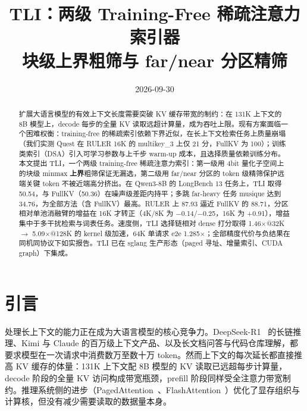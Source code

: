 \documentclass[11pt]{article}
\title{TLI：两级 Training-Free 稀疏注意力索引器\\
\large 块级上界粗筛与 far/near 分区精筛}
\date{2026-09-30}
\begin{document}
\maketitle

\begin{abstract}
扩展大语言模型的有效上下文长度需要突破 KV 缓存带宽的制约：在 131K 上下文的 8B 模型上，decode 每步的全量 KV 读取远超计算量，成为吞吐上限。现有方案面临一个困难权衡：training-free 的稀疏索引依赖下界近似，在长上下文检索任务上质量崩塌（我们实测 Quest 在 RULER 16K 的 multikey\_3 上仅 21 分，FullKV 为 100）；训练类索引（DSA）引入可学习参数与上千步 warm-up 成本，且选择质量依赖训练分布。本文提出 TLI，一个两级 training-free 稀疏注意力索引：第一级用 4bit 量化子空间上的块级 minmax \textbf{上界}粗筛保证无漏选，第二级用 far/near 分区的 token 级精筛保护远端关键 token 不被近端高分挤出。在 Qwen3-8B 的 LongBench 13 任务上，TLI 取得 50.54，与 FullKV（50.36）在噪声级差距内持平；多跳 far-heavy 任务 musique 达到 34.76，为全部方法（含 FullKV）最高。RULER 上 87.93 逼近 FullKV 的 88.71，分区相对单池消融臂的增益在 16K 才转正（4K/8K 为 $-$0.14/$-$0.25，16K 为 +0.91），增益集中于多干扰检索与词表任务。速度侧，TLI 选择链相对 dense 打分取得 1.46$\times$@32K $\rightarrow$ 5.09$\times$@128K 的 kernel 级加速，64K 单请求 e2e 1.285$\times$；全部精度代价与负结果在同机同协议下如实报告。TLI 已在 sglang 生产形态（paged 寻址、增量索引、CUDA graph）下集成。
\end{abstract}

\section{引言}

处理长上下文的能力正在成为大语言模型的核心竞争力。DeepSeek-R1~\cite{dsr1} 的长链推理、Kimi 与 Claude 的百万级上下文产品、以及长文档问答与代码仓库理解，都要求模型在一次请求中消费数万至数十万 token。然而上下文的每次延长都直接推高 KV 缓存的体量：131K 上下文配 8B 模型的 KV 读取已远超每步计算量，decode 阶段的全量 KV 访问构成带宽瓶颈，prefill 阶段同样受全注意力带宽制约。推理系统侧的进步（PagedAttention~\cite{vllm}、FlashAttention~\cite{fa}）优化了显存组织与计算核，但没有减少需要读取的数据量本身。
\end{document}

